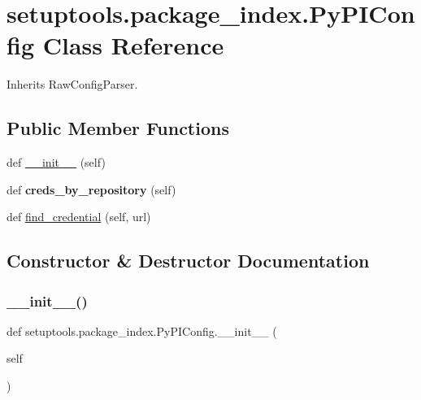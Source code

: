 \hypertarget{classsetuptools_1_1package__index_1_1_py_p_i_config}{}\section{setuptools.\+package\+\_\+index.\+Py\+P\+I\+Config Class Reference}
\label{classsetuptools_1_1package__index_1_1_py_p_i_config}


Inherits Raw\+Config\+Parser.

\subsection*{Public Member Functions}
\begin{DoxyCompactItemize}
\item 
def \hyperlink{classsetuptools_1_1package__index_1_1_py_p_i_config_a32593240a32dc851f55b82f1abebbc86}{\+\_\+\+\_\+init\+\_\+\+\_\+} (self)
\item 
\mbox{\label{classsetuptools_1_1package__index_1_1_py_p_i_config_adc322072461ff5f3499d6187040ebc91}} 
def {\bfseries creds\+\_\+by\+\_\+repository} (self)
\item 
def \hyperlink{classsetuptools_1_1package__index_1_1_py_p_i_config_a591eed255577ae924d683a1cdfc6cbbd}{find\+\_\+credential} (self, url)
\end{DoxyCompactItemize}


\subsection{Constructor \& Destructor Documentation}
\mbox{\label{classsetuptools_1_1package__index_1_1_py_p_i_config_a32593240a32dc851f55b82f1abebbc86}} 
\subsubsection{\texorpdfstring{\+\_\+\+\_\+init\+\_\+\+\_\+()}{\_\_init\_\_()}}
{\footnotesize\ttfamily def setuptools.\+package\+\_\+index.\+Py\+P\+I\+Config.\+\_\+\+\_\+init\+\_\+\+\_\+ (\begin{DoxyParamCaption}\item[{}]{self }\end{DoxyParamCaption})}

